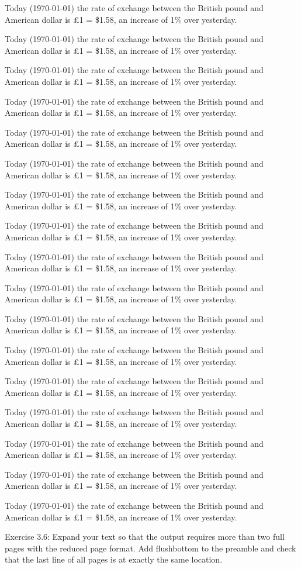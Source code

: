 \documentclass[twoside]{article}
\begin{document}
Today (\today) the rate of exchange between the British
pound and American dollar is \pounds 1 = \$1.58, an
increase of 1\% over yesterday.

Today (\today) the rate of exchange between the British
pound and American dollar is \pounds 1 = \$1.58, an
increase of 1\% over yesterday.

Today (\today) the rate of exchange between the British
pound and American dollar is \pounds 1 = \$1.58, an
increase of 1\% over yesterday.

Today (\today) the rate of exchange between the British
pound and American dollar is \pounds 1 = \$1.58, an
increase of 1\% over yesterday.

Today (\today) the rate of exchange between the British
pound and American dollar is \pounds 1 = \$1.58, an
increase of 1\% over yesterday.

Today (\today) the rate of exchange between the British
pound and American dollar is \pounds 1 = \$1.58, an
increase of 1\% over yesterday.

Today (\today) the rate of exchange between the British
pound and American dollar is \pounds 1 = \$1.58, an
increase of 1\% over yesterday.

Today (\today) the rate of exchange between the British
pound and American dollar is \pounds 1 = \$1.58, an
increase of 1\% over yesterday.

Today (\today) the rate of exchange between the British
pound and American dollar is \pounds 1 = \$1.58, an
increase of 1\% over yesterday.

Today (\today) the rate of exchange between the British
pound and American dollar is \pounds 1 = \$1.58, an
increase of 1\% over yesterday.

Today (\today) the rate of exchange between the British
pound and American dollar is \pounds 1 = \$1.58, an
increase of 1\% over yesterday.

Today (\today) the rate of exchange between the British
pound and American dollar is \pounds 1 = \$1.58, an
increase of 1\% over yesterday.

Today (\today) the rate of exchange between the British
pound and American dollar is \pounds 1 = \$1.58, an
increase of 1\% over yesterday.

Today (\today) the rate of exchange between the British
pound and American dollar is \pounds 1 = \$1.58, an
increase of 1\% over yesterday.

Today (\today) the rate of exchange between the British
pound and American dollar is \pounds 1 = \$1.58, an
increase of 1\% over yesterday.

Today (\today) the rate of exchange between the British
pound and American dollar is \pounds 1 = \$1.58, an
increase of 1\% over yesterday.

Today (\today) the rate of exchange between the British
pound and American dollar is \pounds 1 = \$1.58, an
increase of 1\% over yesterday.

Exercise 3.6: Expand your text so that the output requires more than two
full pages with the reduced page format. Add flushbottom to the preamble
and check that the last line of all pages is at exactly the same
location.


\layout
\end{document}
